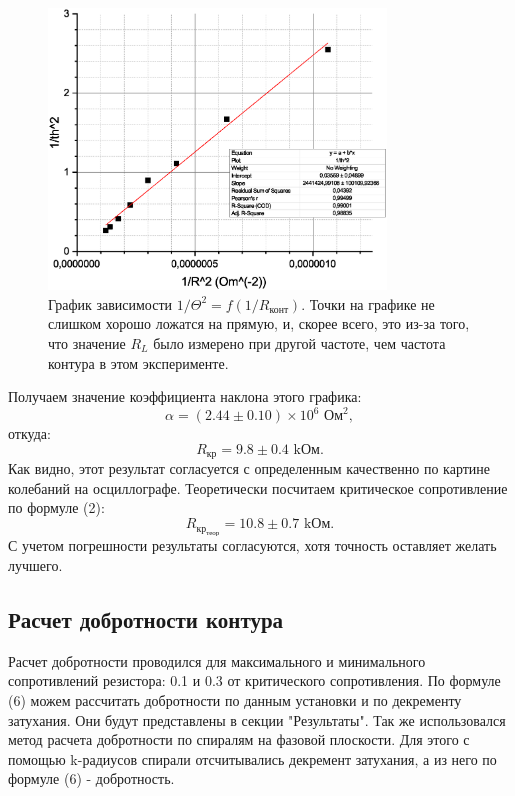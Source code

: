 \documentclass[a4paper, 14pt]{extarticle}%
\newcommand\ECaption[1]{%
     \captionsetup{font=footnotesize}%
     \caption{#1}}
\begin{document}
\begin{figure}[h!]
\begin{center}
\includegraphics[width=0.8\textwidth]{THR}
\end{center}
\ECaption{График зависимости $1/\Theta^2 = f(1/R_{\text{конт}})$. Точки на графике не слишком хорошо ложатся на прямую, и, скорее всего, это из-за того, что значение $R_L$ было измерено при другой частоте, чем частота контура в этом эксперименте. }
\end{figure}

Получаем значение коэффициента наклона этого графика:
\[\alpha = (2.44\pm0.10)\times10^6 \text{ Ом}^2,\]
откуда:
\[R_{\text{кр}} = 9.8\pm0.4 \text{ kОм}.\]
Как видно, этот результат согласуется с определенным качественно по картине колебаний на осциллографе. Теоретически посчитаем критическое сопротивление по формуле (2):
\[R_{\text{кр}_\text{теор}} = 10.8\pm0.7\text{ kОм}.\]
С учетом погрешности результаты согласуются, хотя точность оставляет желать лучшего.

\subsection*{Расчет добротности контура}

Расчет добротности проводился для максимального и минимального сопротивлений резистора: 0.1 и 0.3 от критического сопротивления. По формуле (6) можем рассчитать добротности по данным установки и по декременту затухания. Они будут представлены в секции "Результаты". Так же использовался метод расчета добротности по спиралям на фазовой плоскости. Для этого с помощью k-радиусов спирали отсчитывались декремент затухания, а из него по формуле (6) - добротность.
\end{document}
